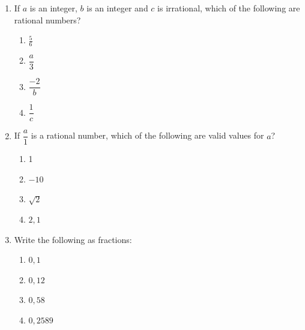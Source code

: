 \begin{exercises}{}{
            \nopagebreak
            \label{m38348*id63121}\begin{enumerate}[itemsep=5pt, label=\textbf{\arabic*}. ] 
            \label{m38348*uid9}\item If $a$ is an integer, $b$ is an integer and $c$ is irrational, which of the following are rational numbers? 
\label{m38348*id734}\begin{enumerate}[itemsep=5pt, label=\textbf{\alph*}. ] 
            \item $\frac{5}{6}$\newline
    \item $\dfrac{a}{3}$\newline
    \item $\dfrac{-2}{b}$\newline
    \item $\dfrac{1}{c}$\end{enumerate}
        \label{m38348*uid10}\item If $\dfrac{a}{1}$ is a rational number, which of the following are valid values for $a$?\label{m38348*id7432}\begin{enumerate}[itemsep=5pt, label=\textbf{\alph*}. ] 
            \item 1\item $-10$\item $\sqrt{2}$\item $2,1$\end{enumerate}
% 
            \label{m38348*uid20}\item Write the following as fractions:\label{m38348*id7322}
	     \begin{enumerate}[itemsep=5pt, label=\textbf{\alph*}. ] 
            \item $0,1$\item $0,12$\item $0,58$\item $0,2589$

\end{enumerate}
\end{enumerate}}
\end{exercises}
